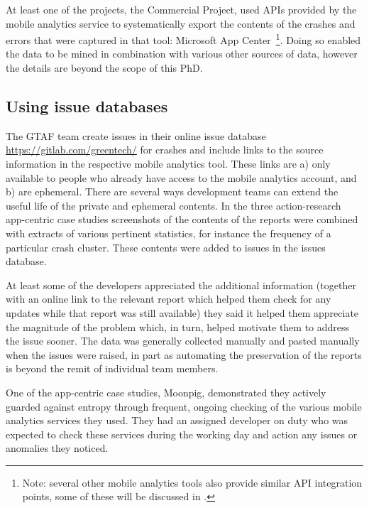 At least one of the projects, the Commercial Project, used APIs provided by the mobile analytics service to systematically export the contents of the crashes and errors that were captured in that tool: Microsoft App Center~\footnote{Note: several other mobile analytics tools also provide similar API integration points, some of these will be discussed in .}. Doing so enabled the data to be mined in combination with various other sources of data, however the details are beyond the scope of this PhD.

\subsection{Using issue databases}
The GTAF team create issues in their online issue database \url{https://gitlab.com/greentech/} for crashes and include links to the source information in the respective mobile analytics tool. These links are a) only available to people who already have access to the mobile analytics account, and b) are ephemeral. There are several ways development teams can extend the useful life of the private and ephemeral contents. In the three action-research app-centric case studies screenshots of the contents of the reports were combined with extracts of various pertinent statistics, for instance the frequency of a particular crash cluster. These contents were added to issues in the issues database. 

At least some of the developers appreciated the additional information (together with an online link to the relevant report which helped them check for any updates while that report was still available) they said it helped them appreciate the magnitude of the problem which, in turn, helped motivate them to address the issue sooner. The data was generally collected manually and pasted manually when the issues were raised, in part as automating the preservation of the reports is beyond the remit of individual team members.

One of the app-centric case studies, Moonpig, demonstrated they actively guarded against entropy through frequent, ongoing checking of the various mobile analytics services they used. They had an assigned developer on duty who was expected to check these services during the working day and action any issues or anomalies they noticed.

